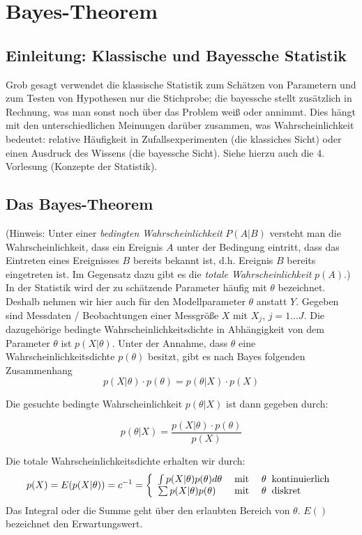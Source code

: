 \section{Bayes-Theorem}
\subsection{Einleitung: Klassische und Bayessche Statistik}
Grob gesagt verwendet die klassische Statistik zum Schätzen von Parametern
und zum Testen von Hypothesen nur die Stichprobe; die bayessche stellt zusätzlich in Rechnung, was man sonst noch über das Problem weiß oder 
annimmt. Dies hängt mit den unterschiedlichen Meinungen darüber zusammen,
was Wahrscheinlichkeit bedeutet: relative Häufigkeit in Zufallsexperimenten
(die klassiches Sicht) oder einen Ausdruck des Wissens (die bayessche Sicht). Siehe hierzu auch die 4. Vorlesung (Konzepte der Statistik).

\subsection{Das Bayes-Theorem} 
(Hinweis: Unter einer \textit{bedingten Wahrscheinlichkeit} $P(A|B)$ versteht man die Wahrscheinlichkeit, dass ein Ereignis $A$ unter der Bedingung eintritt, dass das Eintreten eines Ereignisses $B$ bereits bekannt ist, d.h. Ereignis $B$ bereits eingetreten ist.
Im Gegensatz dazu gibt es die \textit{totale Wahrscheinlichkeit} $p(A)$.)\\ 
In der Statistik wird der zu schätzende Parameter häufig mit $\theta$ bezeichnet. Deshalb nehmen wir hier auch für 
den Modellparameter $\theta$ anstatt $Y$. 
Gegeben sind Messdaten / Beobachtungen einer Messgröße $X$ mit $X_j$, $j=1...J$. Die dazugehörige bedingte
Wahrscheinlichkeitsdichte in Abhängigkeit von dem Parameter $\theta$ ist $p(X|\theta)$. Unter der Annahme, dass $\theta$ eine Wahrscheinlichkeitsdichte 
$p(\theta)$ besitzt, gibt es nach Bayes folgenden Zusammenhang 
\begin{equation}
p(X|\theta)\cdot p(\theta) = p(\theta | X) \cdot p(X)
\end{equation}

Die gesuchte bedingte Wahrscheinlichkeit $p(\theta | X)$ ist dann 
gegeben durch:

\begin{equation}
p(\theta | X) = \frac{p(X|\theta)\cdot p(\theta)}{p(X)} 
\label{eq:BayesTheorem}
\end{equation}

Die totale Wahrscheinlichkeitsdichte erhalten wir durch:
\begin{equation}
p(X) = E(p(X|\theta)) = c^{-1} = \left\lbrace { 
	\begin{array}{l l l}
	\int p(X|\theta) p(\theta) d \theta &\;\mathrm{mit} \; & \theta \;\; \mathrm{kontinuierlich} \\
	\sum  p(X|\theta) p(\theta) &\;\mathrm{mit} \; & \theta \;\; \mathrm{diskret} \\
	\end{array}	
 } \right . 
\end{equation}
Das Integral oder die Summe geht über den erlaubten Bereich von $\theta$. $E()$ bezeichnet den Erwartungswert.

